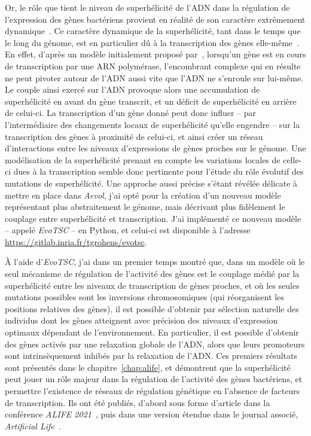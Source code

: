 Or, le rôle que tient le niveau de superhélicité de l'ADN dans la régulation de l'expression des gènes bactériens provient en réalité de son caractère extrêmement dynamique~\citep{martisb.2019}.
Ce caractère dynamique de la superhélicité, tant dans le temps que le long du génome, est en particulier dû à la transcription des gènes elle-même~\citep{visser2022}.
En effet, d'après un modèle initialement proposé par~\cite{liu1987}, lorsqu'un gène est en cours de transcription par une ARN polymérase, l'encombrant complexe qui en résulte ne peut pivoter autour de l'ADN aussi vite que l'ADN ne s'enroule sur lui-même.
Le couple ainsi exercé sur l'ADN provoque alors une accumulation de superhélicité en avant du gène transcrit, et un déficit de superhélicité en arrière de celui-ci.
La transcription d'un gène donné peut donc influer -- par l'intermédiaire des changements locaux de superhélicité qu'elle engendre -- sur la transcription des gènes à proximité de celui-ci, et ainsi créer un réseau d'interactions entre les niveaux d'expressions de gènes proches sur le génome.
Une modélisation de la superhélicité prenant en compte les variations locales de celle-ci dues à la transcription semble donc pertinente pour l'étude du rôle évolutif des mutations de superhélicité.
Une approche aussi précise s'étant révélée délicate à mettre en place dans \emph{Aevol}, j'ai opté pour la création d'un nouveau modèle représentant plus abstraitement le génome, mais décrivant plus fidèlement le couplage entre superhélicité et transcription.
J'ai implémenté ce nouveau modèle -- appelé \emph{EvoTSC} -- en Python, et celui-ci est disponible à l'adresse \url{https://gitlab.inria.fr/tgrohens/evotsc}.

À l'aide d'\emph{EvoTSC}, j'ai dans un premier temps montré que, dans un modèle où le seul mécanisme de régulation de l'activité des gènes est le couplage médié par la superhélicité entre les niveaux de transcription de gènes proches, et où les seules mutations possibles sont les inversions chromosomiques (qui réorganisent les positions relatives des gènes), il est possible d'obtenir par sélection naturelle des individus dont les gènes atteignent avec précision des niveaux d'expression optimaux dépendant de l'environnement.
En particulier, il est possible d'obtenir des gènes activés par une relaxation globale de l'ADN, alors que leurs promoteurs sont intrinsèquement inhibés par la relaxation de l'ADN.
Ces premiers résultats sont présentés dans le chapitre~\ref{chap:alife}, et démontrent que la superhélicité peut jouer un rôle majeur dans la régulation de l'activité des gènes bactériens, et permettre l'existence de réseaux de régulation génétique en l'absence de facteurs de transcription.
Ils ont été publiés, d'abord sous forme d'article dans la conférence \emph{ALIFE 2021}~\citep{grohens2021}, puis dans une version étendue dans le journal associé, \emph{Artificial Life}~\citep{grohens2022a}.

